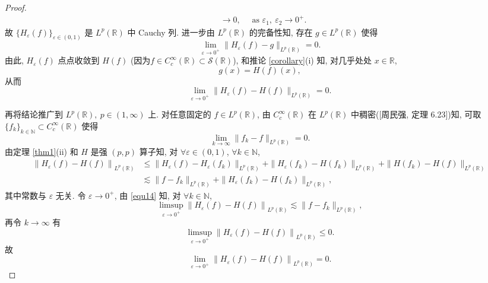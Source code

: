 \documentclass[a4paper,11pt]{article}
\theoremstyle{definition}
\begin{document}
\begin{CJK*}{UTF8}{gbsn}
\begin{proof}
\begin{align*}
            &\to 0, \quad \text{ as } \varepsilon_1, \ \varepsilon_2 \to 0^+.
    \end{align*}
    故 $ \{ H_\varepsilon (f) \}_{\varepsilon \in (0, 1)} $ 是 $ L^p(\mathbb{R}) $ 中 Cauchy 列.  
    进一步由 $ L^p(\mathbb{R}) $ 的完备性知, 存在 $ g \in L^p(\mathbb{R}) $ 使得
    $$ 
        \lim_{\varepsilon \to 0^+} \| H_\varepsilon (f) - g \|_{L^p(\mathbb{R})} = 0.
    $$
    由此, $ H_\varepsilon (f) $ 点点收敛到 $ H (f) $ (因为$f \in C_c^\infty(\mathbb{R}) \subset \mathcal{S}(\mathbb{R})$),
    和推论 \ref{corollary}(i) 知, 对几乎处处 $ x \in \mathbb{R} $,
    $$
        g(x) = H (f)(x),
    $$
    从而
    \begin{equation} \label{equ14}
         \lim_{\varepsilon \to 0^+} \| H_\varepsilon (f) - H (f) \|_{L^p(\mathbb{R})} = 0.
    \end{equation}
        
    再将结论推广到 $ L^p(\mathbb{R}), \ p \in (1, \infty) $ 上.
    对任意固定的 $ f \in L^p(\mathbb{R}) $, 
    由 $ C_c^\infty(\mathbb{R}) $ 在 $ L^p(\mathbb{R}) $ 中稠密([周民强, 定理 6.23])知, 
    可取 $ \{f_k\}_{k \in \mathbb{N}} \subset C_c^\infty(\mathbb{R}) $ 使得
    $$
        \lim_{k \to \infty} \| f_k - f \|_{L^p(\mathbb{R})} = 0.
    $$
    由定理 \ref{thm1}(ii) 和 $ H $ 是强 $ (p, p) $ 算子知, 
    对 $ \forall \varepsilon \in (0, 1) $, $ \forall k \in \mathbb{N} $,
    \begin{align*}
        \left\| H_\varepsilon (f) - H (f) \right\|_{L^p(\mathbb{R})} 
            &\leq \| H_\varepsilon (f) - H_\varepsilon (f_k) \|_{L^p(\mathbb{R})}  
                + \| H_\varepsilon (f_k) - H (f_k) \|_{L^p(\mathbb{R})}
                + \| H (f_k) - H (f) \|_{L^p(\mathbb{R})} \\
            &\lesssim \| f - f_k \|_{L^p(\mathbb{R})} 
                + \| H_\varepsilon (f_k) - H (f_k) \|_{L^p(\mathbb{R})},
    \end{align*}
    其中常数与 $ \varepsilon $ 无关. 令 $ \varepsilon \to 0^+ $, 由 \eqref{equ14} 知, 对 $ \forall k \in \mathbb{N} $,
    $$
        \limsup_{\varepsilon \to 0^+} \left\| H_\varepsilon (f) - H (f) \right\|_{L^p(\mathbb{R})} 
            \lesssim  \| f - f_k \|_{L^p(\mathbb{R})},
    $$
    再令 $ k \to \infty $ 有
    $$
        \limsup_{\varepsilon \to 0^+} \left\| H_\varepsilon (f) - H (f) \right\|_{L^p(\mathbb{R})} \leq 0.
    $$
    故
    $$
        \lim_{\varepsilon \to 0^+} \left\| H_\varepsilon (f) - H (f) \right\|_{L^p(\mathbb{R})} = 0.
    $$
   

\end{proof}
\end{CJK*}
\end{document}
